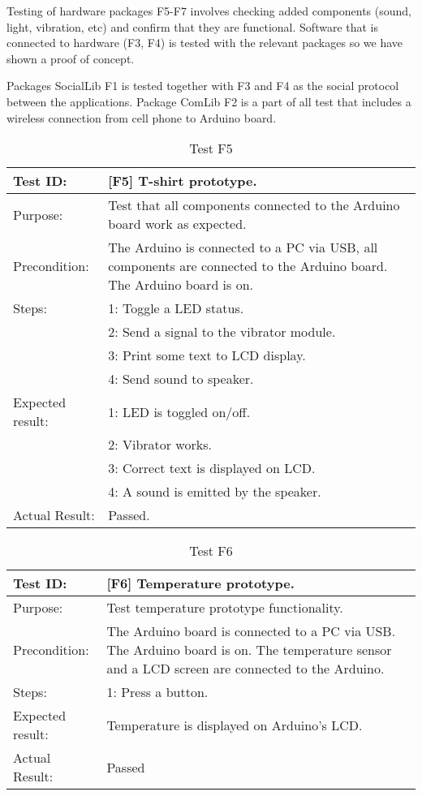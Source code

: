 Testing of hardware packages F5-F7 involves checking added components (sound,
light, vibration, etc) and confirm that they are functional. Software that is
connected to hardware (F3, F4) is tested with the relevant packages so we have
shown a proof of concept.

Packages SocialLib F1 is tested together with F3 and F4 as the social protocol
between the applications. Package ComLib F2 is a part of all test that includes
a wireless connection from cell phone to Arduino board.

\begin{table}[h!]
\begin{tabular}{|l|p{10cm}|}
\hline Test ID: &		[F5] T-shirt prototype. \\
\hline Purpose: &		Test that all components connected to the Arduino board
						work as expected. \\
\hline Precondition: &	The Arduino is connected to a PC via USB, all components
						are connected to the Arduino board. The Arduino board is
						on.\\
\hline
Steps:
 & 1: Toggle a LED status. \\
 & 2: Send a signal to the vibrator module. \\
 & 3: Print some text to LCD display. \\
 & 4: Send sound to speaker.\\
\hline
Expected result:
 & 1: LED is toggled on/off.\\
 & 2: Vibrator works. \\ 
 & 3: Correct text is displayed on LCD. \\ 
 & 4: A sound is emitted by the speaker. \\
\hline
Actual Result:
 & Passed. \\
\hline
\end{tabular}
\caption{Test F5}
\label{tbl:f5test}
\end{table}

\begin{table}[h!]
\begin{tabular}{|l|p{10cm}|}
\hline Test ID: &		[F6] Temperature prototype. \\
\hline Purpose: &		Test temperature prototype functionality. \\
\hline Precondition: &	The Arduino board is connected to a PC via USB. The
						Arduino board is on. The temperature sensor and a LCD
						screen are connected to the Arduino.\\
\hline
Steps:
 & 1: Press a button. \\
\hline
Expected result:
 & Temperature is displayed on Arduino's LCD.\\ 
\hline
Actual Result:
 & Passed \\
\hline
\end{tabular}
\caption{Test F6}
\label{tbl:f6test}
\end{table}

